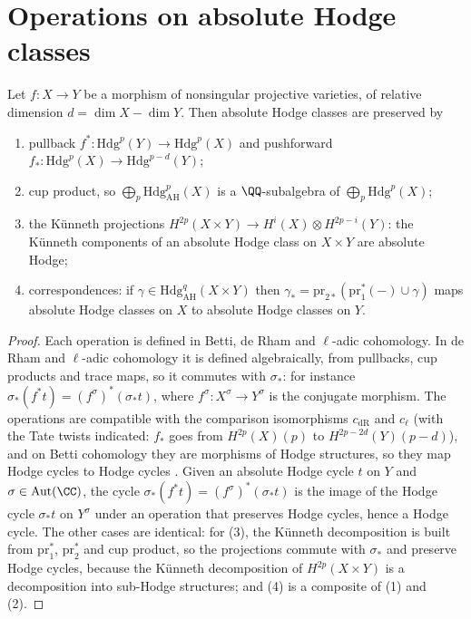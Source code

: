 \section{Operations on absolute Hodge classes}\label{absolute-hodge:section-operations}

\begin{proposition}\label{absolute-hodge:proposition-operations}
Let $f \colon X \to Y$ be a morphism of nonsingular projective varieties, of relative dimension $d = \dim X - \dim Y$. Then absolute Hodge classes are preserved by
\begin{enumerate}
\item pullback $f^* \colon \mathrm{Hdg}^p(Y) \to \mathrm{Hdg}^p(X)$ and pushforward $f_* \colon \mathrm{Hdg}^p(X) \to \mathrm{Hdg}^{p-d}(Y)$;
\item cup product, so $\bigoplus_p\mathrm{Hdg}^p_{\mathrm{AH}}(X)$ is a $\QQ$-subalgebra of $\bigoplus_p\mathrm{Hdg}^p(X)$;
\item the K\"unneth projections $H^{2p}(X \times Y) \to H^i(X) \otimes H^{2p-i}(Y)$: the K\"unneth components of an absolute Hodge class on $X \times Y$ are absolute Hodge;
\item correspondences: if $\gamma \in \mathrm{Hdg}^q_{\mathrm{AH}}(X \times Y)$ then $\gamma_* = \mathrm{pr}_{2*}(\mathrm{pr}_1^*(-) \cup \gamma)$ maps absolute Hodge classes on $X$ to absolute Hodge classes on $Y$.
\end{enumerate}
\end{proposition}

\begin{proof}
Each operation is defined in Betti, de Rham and $\ell$-adic cohomology. In de Rham and $\ell$-adic cohomology it is defined algebraically, from pullbacks, cup products and trace maps, so it commutes with
$\sigma_*$: for instance $\sigma_*(f^*t) = (f^\sigma)^*(\sigma_*t)$, where $f^\sigma \colon X^\sigma \to Y^\sigma$ is the conjugate morphism. The operations are compatible with the comparison isomorphisms
$c_{\mathrm{dR}}$ and $c_\ell$ (with the Tate twists indicated: $f_*$ goes from $H^{2p}(X)(p)$ to $H^{2p-2d}(Y)(p - d)$), and on Betti cohomology they are morphisms of Hodge structures, so they map Hodge cycles to Hodge
cycles \cite{deligne-abelian}. Given an absolute Hodge cycle $t$ on $Y$ and $\sigma \in \mathrm{Aut}(\CC)$, the cycle $\sigma_*(f^*t) = (f^\sigma)^*(\sigma_*t)$ is the image of the Hodge cycle $\sigma_*t$ on $Y^\sigma$
under an operation that preserves Hodge cycles, hence a Hodge cycle. The other cases are identical: for (3), the K\"unneth decomposition is built from $\mathrm{pr}_1^*$, $\mathrm{pr}_2^*$ and cup product, so the
projections commute with $\sigma_*$ and preserve Hodge cycles, because the K\"unneth decomposition of $H^{2p}(X \times Y)$ is a decomposition into sub-Hodge structures; and (4) is a composite of (1) and (2).
\end{proof}

